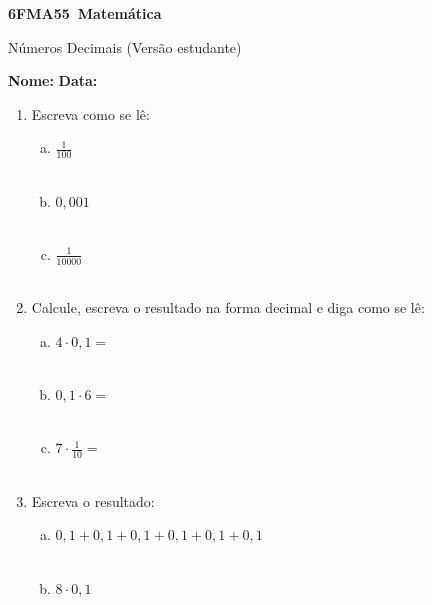 \documentclass[a4paper,14pt]{article}
\begin{document}
	
	\noindent\textbf{6FMA55~Matemática} 
	
	\begin{center}Números Decimais (Versão estudante)
	\end{center}
	
	\noindent\textbf{Nome:} \underline{\hspace{10cm}}
	\noindent\textbf{Data:} \underline{\hspace{4cm}}
	
	
	
    \begin{multicols}{2}
    	\begin{enumerate}
    		\item Escreva como se lê:
	    	\begin{enumerate}[a)]
				\item $\frac{1}{100}$ \\\\
				\item $0,001$ \\\\
				\item $\frac{1}{10000}$ \\\\
	        \end{enumerate}
        	\item Calcule, escreva o resultado na forma decimal e diga como se lê:
        	\begin{enumerate}[a)]
        		\item $4 \cdot 0,1 = $ \\\\
        		\item $0,1 \cdot 6 = $ \\\\
        		\item $7 \cdot \frac{1}{10} = $ \\\\
        	\end{enumerate}
            \item Escreva o resultado:
            \begin{enumerate}[a)]
            	\item $0,1 + 0,1 + 0,1 + 0,1 + 0,1 + 0,1$ \\\\
            	\item $8 \cdot 0,1$ \\\\

\end{enumerate}
\end{enumerate}
\end{multicols}
\end{document}
